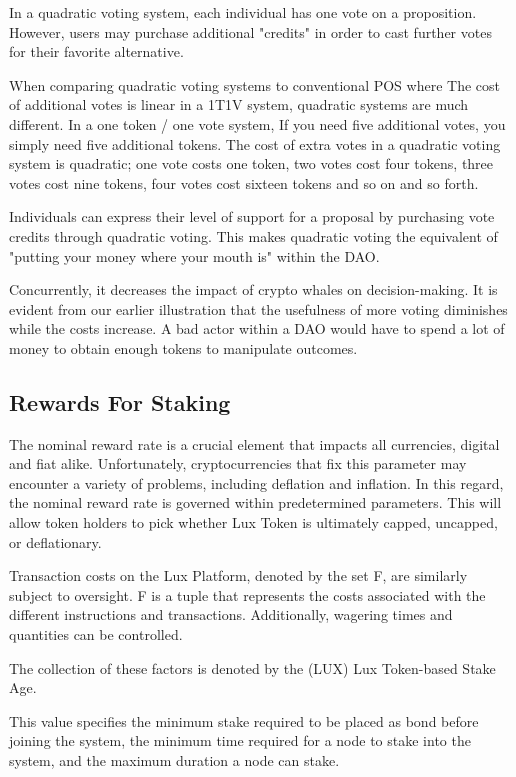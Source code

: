 \documentclass[11pt]{article}
\begin{document}
In a quadratic voting system, each individual has one vote on a proposition. However, users may purchase additional "credits" in order to cast further votes for their favorite alternative.


When comparing quadratic voting systems to conventional POS where The cost of additional votes is linear in a 1T1V system, quadratic systems are much different. In a one token / one vote system, If you need five additional votes, you simply need five additional tokens. The cost of extra votes in a quadratic voting system is quadratic; one vote costs one token, two votes cost four tokens, three votes cost nine tokens, four votes cost sixteen tokens and so on and so forth.


Individuals can express their level of support for a proposal by purchasing vote credits through quadratic voting. This makes quadratic voting the equivalent of "putting your money where your mouth is" within the DAO.


Concurrently, it decreases the impact of crypto whales on decision-making. It is evident from our earlier illustration that the usefulness of more voting diminishes while the costs increase. A bad actor within a DAO would have to spend a lot of money to obtain enough tokens to manipulate outcomes.


\subsection{Rewards For Staking}

The nominal reward rate is a crucial element that impacts all currencies, digital and fiat alike. Unfortunately, cryptocurrencies that fix this parameter may encounter a variety of problems, including deflation and inflation. In this regard, the nominal reward rate is governed within predetermined parameters. This will allow token holders to pick whether Lux Token is ultimately capped, uncapped, or deflationary.


Transaction costs on the Lux Platform, denoted by the set F, are similarly subject to oversight. F is a tuple that represents the costs associated with the different instructions and transactions. Additionally, wagering times and quantities can be controlled.


The collection of these factors is denoted by the (LUX) Lux Token-based Stake Age.


This value specifies the minimum stake required to be placed as bond before joining the system, the minimum time required for a node to stake into the system, and the maximum duration a node can stake.
\end{document}
